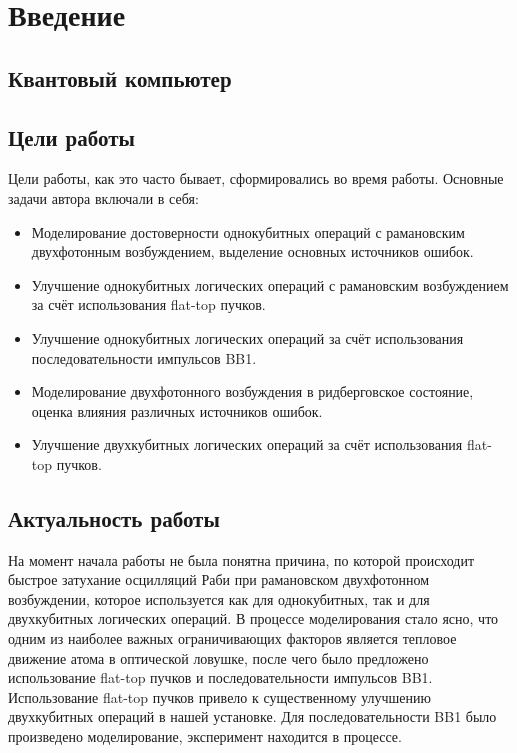 \newpage



\section{Введение}
\label{sec:Introduction} 


\subsection{Квантовый компьютер}



\subsection{Цели работы}

Цели работы, как это часто бывает, сформировались во время работы. Основные задачи автора включали в себя:

\begin{itemize}
	\item Моделирование достоверности однокубитных операций с рамановским двухфотонным возбуждением, выделение основных источников ошибок.

	\item Улучшение однокубитных логических операций с рамановским возбуждением за счёт использования flat-top пучков. 

	\item Улучшение однокубитных логических операций за счёт использования последовательности импульсов BB1.

	\item Моделирование двухфотонного возбуждения в ридберговское состояние, оценка влияния различных источников ошибок.

	\item Улучшение двухкубитных логических операций за счёт использования flat-top пучков. 
\end{itemize}

\subsection{Актуальность работы}

На момент начала работы не была понятна причина, по которой происходит быстрое затухание осцилляций Раби при рамановском двухфотонном возбуждении, которое используется как для однокубитных, так и для двухкубитных логических операций. В процессе моделирования стало ясно, что одним из наиболее важных ограничивающих факторов является тепловое движение атома в оптической ловушке, после чего было предложено использование flat-top пучков и последовательности импульсов BB1. Использование flat-top пучков привело к существенному улучшению двухкубитных операций в нашей установке. Для последовательности BB1 было произведено моделирование, эксперимент находится в процессе.

